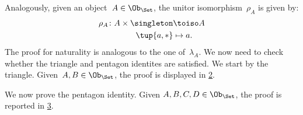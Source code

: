\begin{example}
  \begin{figure}[h!]
    \begin{center}
    \end{center}
    \caption{\label{fig:monoidal_set_unit_nat}}
  \end{figure}

  Analogously, given an object~$A\in \Ob_{\Set}$, the unitor isomorphism~$\rho_A$ is given by:
  \begin{equation*}
    \begin{aligned}
      \rho_A\colon A\times \singleton &\toiso A\\
      \tup{a,\ast}&\mapsto a.
    \end{aligned}
  \end{equation*}
  The proof for naturality is analogous to the one of~$\lambda_A$. We now need to check whether the triangle and pentagon identites are satisfied. We start by the triangle. Given~$A,B\in \Ob_{\Set}$, the proof is displayed in \cref{fig:set_mon_triangle}.

  \begin{figure}[h]
    \begin{center}
    \end{center}
    \caption{\label{fig:set_mon_triangle}}
  \end{figure}

  We now prove the pentagon identity. Given $A,B,C,D\in \Ob_\Set$, the proof is reported in \cref{fig:set_mon_pent}.


  \begin{figure}[h]
    \begin{center}
    \end{center}
    \caption{\label{fig:set_mon_pent}}
  \end{figure}
\end{example}



